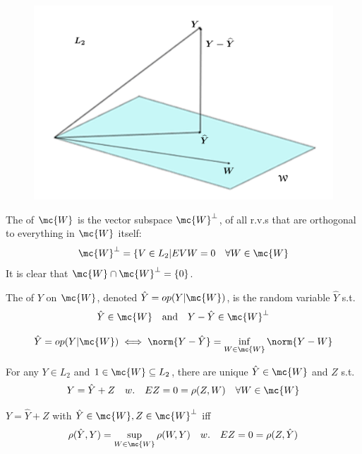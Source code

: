 \documentclass[11pt]{article}
\numberwithin{equation}{section}
\begin{document}
\begin{figure}[H]
	\centering
	\includegraphics[scale=0.5]{p4}
\end{figure}
\noindent The  of $\mc{W}$ is the vector subspace $\mc{W}^\perp$, of all r.v.s that are orthogonal to everything in $\mc{W}$ itself:
\begin{equation}
	\mc{W}^\perp = \{V \in L_2 | EVW = 0 \quad \forall W \in \mc{W}
\end{equation}
It is clear that $\mc{W} \cap \mc{W}^\perp = \{0\}$.

The  of $Y$ on $\mc{W}$, denoted $\hat{Y} = op(Y|\mc{W})$, is the random variable $\hat{Y}$ s.t.
$$\hat{Y} \in \mc{W} \quad \text{and} \quad Y - \hat{Y} \in \mc{W}^\perp$$

\begin{equation}
	\hat{Y} = op(Y|\mc{W}) \iff \norm{Y - \hat{Y}} = \inf_{W \in \mc{W}} \norm{Y - W}
\end{equation}

For any $Y \in L_2$ and $1 \in \mc{W} \subseteq L_2$, there are unique $\hat{Y} \in \mc{W}$ and $Z$ s.t.
$$Y = \hat{Y} + Z \quad w. \quad EZ = 0 = \rho(Z, W) \quad \forall W \in \mc{W}$$

$Y = \hat{Y} + Z$ with $\hat{Y} \in \mc{W}, Z \in \mc{W}^\perp$ iff 
$$\rho(\hat{Y}, Y) = \sup_{W \in \mc{W}} \rho(W, Y) \quad w. \quad EZ = 0 = \rho(Z, \hat{Y})$$
\end{document}
